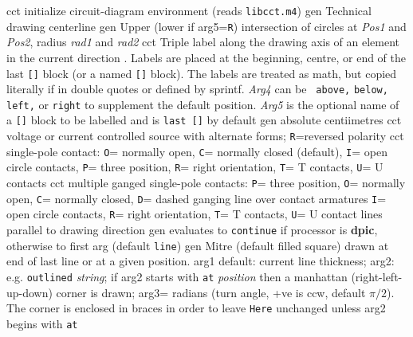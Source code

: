   {cct}
  {initialize circuit-diagram environment (reads {\tt libcct.m4})}
  {gen}
  {Technical drawing centerline}
  {gen}
  {Upper (lower if arg5={\tt R}) intersection of circles at
    {\sl Pos1} and {\sl Pos2}, radius {\sl rad1} and {\sl rad2}}
  {cct}
  {Triple label along the drawing axis of an element in the current
    direction .  Labels are placed at the beginning,
    centre, or end of the last {\tt []} block (or a named {\tt []}
    block). The labels are treated as math, but copied literally if
    in double quotes or defined by sprintf.  {\sl Arg4} can be {\tt
    above,} {\tt below,} {\tt left,} or {\tt right} to supplement the
    default position.  {\sl Arg5} is the optional name of a {\tt []}
    block to be labelled and is {\tt last []} by default}
  {gen}
  {absolute centiimetres}
  {cct}
  {voltage or current controlled source with alternate forms;
   {\tt R}=reversed polarity}
  {cct}
  {single-pole contact:
   {\tt O}= normally open,
   {\tt C}= normally closed (default),
   {\tt I}= open circle contacts,
   {\tt P}= three position,
   {\tt R}= right orientation,
   {\tt T}= T contacts,
   {\tt U}= U contacts
   }
  {cct}
  {multiple ganged single-pole contacts:
   {\tt P}= three position,
   {\tt O}= normally open,
   {\tt C}= normally closed,
   {\tt D}= dashed ganging line over contact armatures
   {\tt I}= open circle contacts,
   {\tt R}= right orientation,
   {\tt T}= T contacts,
   {\tt U}= U contact lines parallel to drawing direction
   }
  {gen}
  {evaluates to {\tt continue}
    if processor is {\bf dpic}, otherwise to first arg (default {\tt line})}
  {gen}
  { Mitre (default filled square) drawn at end of last line or at a
    given position.
    arg1 default: current line thickness;
    arg2: e.g. {\tt outlined} {\sl string}; if arg2 starts with
    {\tt at} {\sl position} then a manhattan (right-left-up-down) corner
    is drawn;
    arg3= radians (turn angle, +ve is ccw, default $\pi/2$).
    The corner is enclosed in braces
    in order to leave {\tt Here} unchanged unless arg2 begins with {\tt at}
    }
